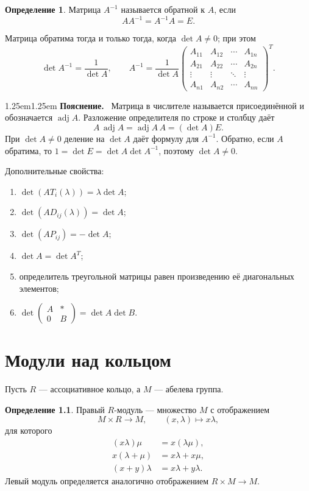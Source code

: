 \documentclass[12pt,a4paper,oneside,openany]{book}
\theoremstyle{definition}
\newtheorem{definition}{Определение}[chapter]
\theoremstyle{plain}
\theoremstyle{remark}
\newenvironment{explanation}
  {\begin{adjustwidth}{1.25em}{1.25em}\small
   \noindent\textcolor{logicteal}{\sffamily\bfseries Пояснение.}\ }
  {\par\end{adjustwidth}}
\begin{document}
\begin{definition}
Матрица $A^{-1}$ называется обратной к $A$, если
\[
  AA^{-1}=A^{-1}A=E.
\]
\end{definition}

Матрица обратима тогда и только тогда, когда $\det A\ne0$; при этом
\[
  \det A^{-1}=\frac1{\det A},
  \qquad
  A^{-1}=\frac1{\det A}
  \begin{pmatrix}
  A_{11}&A_{12}&\cdots&A_{1n}\\
  A_{21}&A_{22}&\cdots&A_{2n}\\
  \vdots&\vdots&\ddots&\vdots\\
  A_{n1}&A_{n2}&\cdots&A_{nn}
  \end{pmatrix}^{T}.
\]

\begin{explanation}
Матрица в числителе называется присоединённой и обозначается
$\operatorname{adj}A$. Разложение определителя по строке и столбцу даёт
\[
  A\,\operatorname{adj}A
  =\operatorname{adj}A\,A
  =(\det A)E.
\]
При $\det A\ne0$ деление на $\det A$ даёт формулу для $A^{-1}$.
Обратно, если $A$ обратима, то
$1=\det E=\det A\det A^{-1}$, поэтому $\det A\ne0$.
\end{explanation}


Дополнительные свойства:
\begin{enumerate}[label=\arabic*)]
  \item $\det(AT_i(\lambda))=\lambda\det A$;
  \item $\det(AD_{ij}(\lambda))=\det A$;
  \item $\det(AP_{ij})=-\det A$;
  \item $\det A=\det A^T$;
  \item определитель треугольной матрицы равен произведению её
  диагональных элементов;
  \item $\det\begin{pmatrix}A&*\\0&B\end{pmatrix}=\det A\det B$.
\end{enumerate}

\chapter{Модули над кольцом}

Пусть $R$ --- ассоциативное кольцо, а $M$ --- абелева группа.

\begin{definition}
Правый $R$-модуль --- множество $M$ с отображением
\[
  M\times R\to M,\qquad (x,\lambda)\mapsto x\lambda,
\]
для которого
\[
\begin{aligned}
  (x\lambda)\mu&=x(\lambda\mu),\\
  x(\lambda+\mu)&=x\lambda+x\mu,\\
  (x+y)\lambda&=x\lambda+y\lambda.
\end{aligned}
\]
Левый модуль определяется аналогично отображением $R\times M\to M$.
\end{definition}
\end{document}
